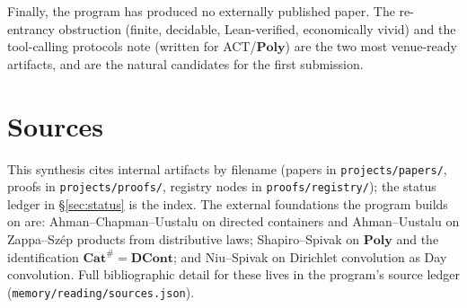 \documentclass[11pt]{article}
\theoremstyle{plain}
\theoremstyle{definition}
\theoremstyle{remark}
\newcommand{\DCont}{\mathbf{DCont}}
\newcommand{\Cat}{\mathbf{Cat}}
\newcommand{\Poly}{\mathbf{Poly}}
\begin{document}
Finally, the program has produced no externally published paper. The re-entrancy
obstruction (finite, decidable, Lean-verified, economically vivid) and the tool-calling
protocols note (written for ACT/$\Poly$) are the two most venue-ready artifacts, and are
the natural candidates for the first submission.

\section*{Sources}

This synthesis cites internal artifacts by filename (papers in
\texttt{projects/papers/}, proofs in \texttt{projects/proofs/}, registry nodes in
\texttt{proofs/registry/}); the status ledger in \S\ref{sec:status} is the index. The
external foundations the program builds on are: Ahman--Chapman--Uustalu on directed
containers and Ahman--Uustalu on Zappa--Sz\'ep products from distributive laws;
Shapiro--Spivak on $\Poly$ and the identification $\Cat^\# = \DCont$; and Niu--Spivak on
Dirichlet convolution as Day convolution. Full bibliographic detail for these lives in the
program's source ledger (\texttt{memory/reading/sources.json}).
\end{document}
